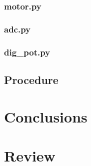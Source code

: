 \documentclass[a4]{report}
\begin{document}
	\subsection{motor.py}
	\subsection{adc.py}
	\subsection{dig\_pot.py}



	\section{Procedure}




	\chapter*{Conclusions}
	



	\chapter*{Review}
	
\end{document}
